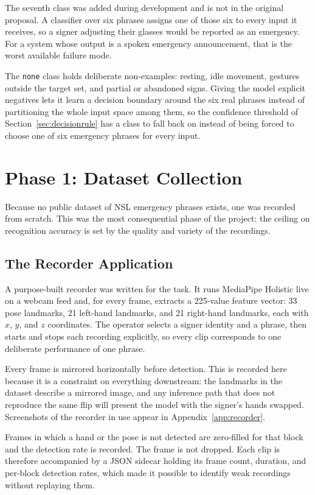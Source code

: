 The seventh class was added during development and is not in the original proposal. A classifier over six phrases assigns one of those six to every input it receives, so a signer adjusting their glasses would be reported as an emergency. For a system whose output is a spoken emergency announcement, that is the worst available failure mode.

The \texttt{none} class holds deliberate non-examples: resting, idle movement, gestures outside the target set, and partial or abandoned signs. Giving the model explicit negatives lets it learn a decision boundary around the six real phrases instead of partitioning the whole input space among them, so the confidence threshold of Section~\ref{sec:decisionrule} has a class to fall back on instead of being forced to choose one of six emergency phrases for every input.

\section{Phase 1: Dataset Collection}
\label{sec:datasetcollection}

Because no public dataset of NSL emergency phrases exists, one was recorded from scratch. This was the most consequential phase of the project: the ceiling on recognition accuracy is set by the quality and variety of the recordings.

\subsection{The Recorder Application}

A purpose-built recorder was written for the task. It runs MediaPipe Holistic live on a webcam feed and, for every frame, extracts a 225-value feature vector: 33 pose landmarks, 21 left-hand landmarks, and 21 right-hand landmarks, each with $x$, $y$, and $z$ coordinates. The operator selects a signer identity and a phrase, then starts and stops each recording explicitly, so every clip corresponds to one deliberate performance of one phrase.

Every frame is mirrored horizontally before detection. This is recorded here because it is a constraint on everything downstream: the landmarks in the dataset describe a mirrored image, and any inference path that does not reproduce the same flip will present the model with the signer's hands swapped. Screenshots of the recorder in use appear in Appendix~\ref{app:recorder}.

Frames in which a hand or the pose is not detected are zero-filled for that block and the detection rate is recorded. The frame is not dropped. Each clip is therefore accompanied by a JSON sidecar holding its frame count, duration, and per-block detection rates, which made it possible to identify weak recordings without replaying them.

